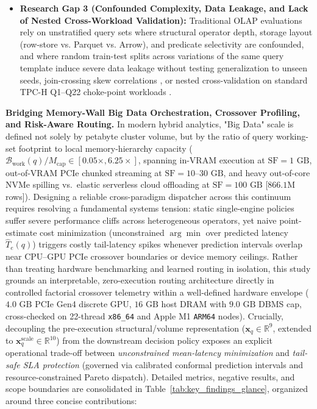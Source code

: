 \documentclass[10pt,a4paper]{article}
\begin{document}
\begin{itemize}[leftmargin=1.5em,itemsep=2pt]
    \item \textbf{Research Gap 3 (Confounded Complexity, Data Leakage, and Lack of Nested Cross-Workload Validation):} Traditional OLAP evaluations \cite{ahmed2020hibench, abdalla2022bigdata} rely on unstratified query sets where structural operator depth, storage layout (row-store vs. Parquet vs. Arrow), and predicate selectivity are confounded, and where random train-test splits across variations of the same query template induce severe data leakage without testing generalization to unseen seeds, join-crossing skew correlations \cite{boncz2017jcch}, or nested cross-validation on standard TPC-H Q1--Q22 choke-point workloads \cite{boncz2014tpch, dreseler2020quantifying}.
\end{itemize}

\par\vspace{7pt plus 2pt minus 1pt}\noindent\textbf{Bridging Memory-Wall Big Data Orchestration, Crossover Profiling, and Risk-Aware Routing.}
In modern hybrid analytics, "Big Data" scale is defined not solely by petabyte cluster volume, but by the ratio of query working-set footprint to local memory-hierarchy capacity ($\mathcal{B}_{\text{work}}(q)/M_{\text{cap}} \in [0.05\times, 6.25\times]$, spanning in-VRAM execution at $\text{SF}=1\text{ GB}$, out-of-VRAM PCIe chunked streaming at $\text{SF}=10\text{--}30\text{ GB}$, and heavy out-of-core NVMe spilling vs.\ elastic serverless cloud offloading at $\text{SF}=100\text{ GB}$ [$866.1\text{M}$ rows]). Designing a reliable cross-paradigm dispatcher across this continuum requires resolving a fundamental systems tension: static single-engine policies suffer severe performance cliffs across heterogeneous operators, yet naive point-estimate cost minimization (unconstrained $\arg\min$ over predicted latency $\hat{T}_e(q)$) triggers costly tail-latency spikes whenever prediction intervals overlap near CPU--GPU PCIe crossover boundaries or device memory ceilings. Rather than treating hardware benchmarking and learned routing in isolation, this study grounds an interpretable, zero-execution routing architecture directly in controlled factorial crossover telemetry within a well-defined hardware envelope ($4.0\text{ GB}$ PCIe Gen4 discrete GPU, $16\text{ GB}$ host DRAM with $9.0\text{ GB}$ DBMS cap, cross-checked on 22-thread \texttt{x86\_64} and Apple M1 \texttt{ARM64} nodes). Crucially, decoupling the pre-execution structural/volume representation ($\mathbf{x}_q \in \mathbb{R}^9$, extended to $\mathbf{x}_q^{\text{scale}}\in\mathbb{R}^{10}$) from the downstream decision policy exposes an explicit operational trade-off between \emph{unconstrained mean-latency minimization} and \emph{tail-safe SLA protection} (governed via calibrated conformal prediction intervals and resource-constrained Pareto dispatch). Detailed metrics, negative results, and scope boundaries are consolidated in Table~\ref{tab:key_findings_glance}, organized around three concise contributions:
\end{document}
